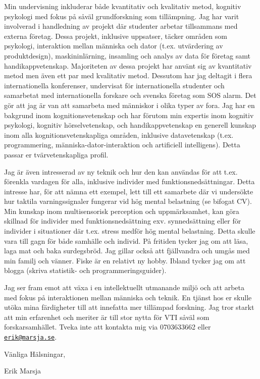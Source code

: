 \documentclass[]{article}
\begin{document}
Min undervisning inkluderar både kvantitativ och kvalitativ metod,
kognitiv psykologi med fokus på såväl grundforskning som tillämpning.
Jag har varit involverad i handledning av projekt där studenter arbetar
tillsammans med externa företag. Dessa projekt, inklusive uppsatser,
täcker områden som psykologi, interaktion mellan människa och dator
(t.ex. utvärdering av produktdesign), maskininlärning, insamling och
analys av data för företag samt handikappvetenskap. Majoriteten av dessa
projekt har använt sig av kvantitativ metod men även ett par med
kvalitativ metod. Dessutom har jag deltagit i flera internationella
konferenser, undervisat för internationella studenter och samarbetat med
internationella forskare och svenska företag som SOS alarm. Det gör att
jag är van att samarbeta med människor i olika typer av fora. Jag har en
bakgrund inom kognitionsvetenskap och har förutom min expertis inom
kognitiv psykologi, kognitiv hörselvetenskap, och handikappvetenskap en
generell kunskap inom alla kognitionsvetenskapliga områden, inklusive
datavetenskap (t.ex. programmering, människa-dator-interaktion och
artificiell intelligens). Detta passar er tvärvetenskapliga profil.

Jag är även intresserad av ny teknik och hur den kan användas för att
t.ex. förenkla vardagen för alla, inklusive individer med
funktionsnedsättningar. Detta intresse har, för att nämna ett exempel,
lett till ett samarbete där vi undersökte hur taktila varningssignaler
fungerar vid hög mental belastning (se bifogat CV). Min kunskap inom
multisensorisk perception och uppmärksamhet, kan göra skillnad för
individer med funktionsnedsättning exv. synnedsättning eller för
individer i situationer där t.ex. stress medför hög mental belastning.
Detta skulle vara till gagn för både samhälle och individ. På fritiden
tycker jag om att läsa, laga mat och baka surdegsbröd. Jag gillar också
att fjällvandra och umgås med min familj och vänner. Fiske är en
relativt ny hobby. Ibland tycker jag om att blogga (skriva statistik-
och programmeringsguider).

Jag ser fram emot att växa i en intellektuellt utmanande miljö och att
arbeta med fokus på interaktionen mellan människa och teknik. En tjänst
hos er skulle utöka mina färdigheter till att innefatta mer tillämpad
forskning. Jag tror starkt att min erfarenhet och meriter är till stor
nytta för VTI såväl som forskarsamhället. Tveka inte att kontakta mig
via 0703633662 eller
\href{mailto:erik@marsja.se}{\nolinkurl{erik@marsja.se}}.

Vänliga Hälsningar,

Erik Marsja
\end{document}
